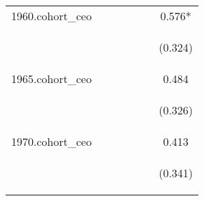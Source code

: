 \begin{center}
\begin{tabular}{lcccccc}
1960.cohort\_ceo &  &  &  &  &  & 0.576* \\
\vspace{4pt} & \begin{footnotesize}\end{footnotesize} & \begin{footnotesize}\end{footnotesize} & \begin{footnotesize}\end{footnotesize} & \begin{footnotesize}\end{footnotesize} & \begin{footnotesize}\end{footnotesize} & \begin{footnotesize}(0.324)\end{footnotesize} \\
1965.cohort\_ceo &  &  &  &  &  & 0.484 \\
\vspace{4pt} & \begin{footnotesize}\end{footnotesize} & \begin{footnotesize}\end{footnotesize} & \begin{footnotesize}\end{footnotesize} & \begin{footnotesize}\end{footnotesize} & \begin{footnotesize}\end{footnotesize} & \begin{footnotesize}(0.326)\end{footnotesize} \\
1970.cohort\_ceo &  &  &  &  &  & 0.413 \\
\vspace{4pt} & \begin{footnotesize}\end{footnotesize} & \begin{footnotesize}\end{footnotesize} & \begin{footnotesize}\end{footnotesize} & \begin{footnotesize}\end{footnotesize} & \begin{footnotesize}\end{footnotesize} & \begin{footnotesize}(0.341)\end{footnotesize} \\

\end{tabular}
\end{center}
